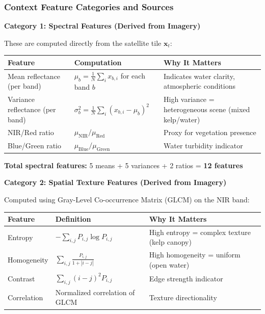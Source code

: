 \documentclass[11pt]{article}
\begin{document}
\subsubsection{Context Feature Categories and Sources}

\textbf{Category 1: Spectral Features (Derived from Imagery)}

These are computed directly from the satellite tile $\mathbf{x}_t$:

\begin{center}
\begin{tabular}{p{3.5cm}p{4cm}p{4.5cm}}
\toprule
\textbf{Feature} & \textbf{Computation} & \textbf{Why It Matters} \\
\midrule
Mean reflectance (per band) & $\mu_b = \frac{1}{N}\sum_{i} x_{b,i}$ for each band $b$ & Indicates water clarity, atmospheric conditions \\
Variance reflectance (per band) & $\sigma^2_b = \frac{1}{N}\sum_i (x_{b,i} - \mu_b)^2$ & High variance = heterogeneous scene (mixed kelp/water) \\
NIR/Red ratio & $\mu_{\text{NIR}} / \mu_{\text{Red}}$ & Proxy for vegetation presence \\
Blue/Green ratio & $\mu_{\text{Blue}} / \mu_{\text{Green}}$ & Water turbidity indicator \\
\bottomrule
\end{tabular}
\end{center}

\textbf{Total spectral features:} 5 means + 5 variances + 2 ratios = \textbf{12 features}

\textbf{Category 2: Spatial Texture Features (Derived from Imagery)}

Computed using Gray-Level Co-occurrence Matrix (GLCM) on the NIR band:

\begin{center}
\begin{tabular}{p{3cm}p{4.5cm}p{4.5cm}}
\toprule
\textbf{Feature} & \textbf{Definition} & \textbf{Why It Matters} \\
\midrule
Entropy & $-\sum_{i,j} P_{i,j} \log P_{i,j}$ & High entropy = complex texture (kelp canopy) \\
Homogeneity & $\sum_{i,j} \frac{P_{i,j}}{1 + |i-j|}$ & High homogeneity = uniform (open water) \\
Contrast & $\sum_{i,j} (i-j)^2 P_{i,j}$ & Edge strength indicator \\
Correlation & Normalized correlation of GLCM & Texture directionality \\
\bottomrule
\end{tabular}
\end{center}
\end{document}
